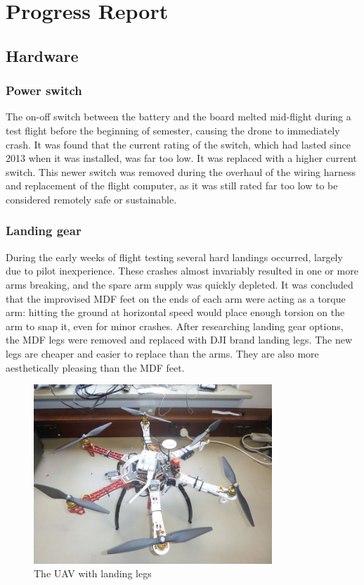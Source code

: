 \documentclass[a4paper, 12pt, titlepage]{article}
\begin{document}
\section{Progress Report}
	\subsection{Hardware}
		\subsubsection{Power switch}
The on-off switch between the battery and the board melted mid-flight during a test flight before the beginning of semester, causing the drone to immediately crash. It was found that the current rating of the switch, which had lasted since 2013 when it was installed, was far too low. It was replaced with a higher current switch. This newer switch was removed during the overhaul of the wiring harness and replacement of the flight computer, as it was still rated far too low to be considered remotely safe or sustainable.

		\subsubsection{Landing gear}
During the early weeks of flight testing several hard landings occurred, largely due to pilot inexperience. These crashes almost invariably resulted in one or more arms breaking, and the spare arm supply was quickly depleted. It was concluded that the improvised MDF feet on the ends of each arm were acting as a torque arm: hitting the ground at horizontal speed would place enough torsion on the arm to snap it, even for minor crashes. After researching landing gear options, the MDF legs were removed and replaced with DJI brand landing legs. The new legs are cheaper and easier to replace than the arms. They are also more aesthetically pleasing than the MDF feet.

\begin{figure}[h!]
\includegraphics[width=0.8\textwidth]{landingLegs.JPG}
\centering
\caption{The UAV with landing legs}
\end{figure}
\end{document}
